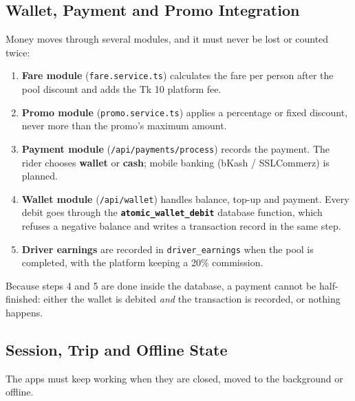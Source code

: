 \subsection{Wallet, Payment and Promo Integration}
\label{subsec:payment-integration}

Money moves through several modules, and it must never be lost or counted
twice:

\begin{enumerate}
  \item \textbf{Fare module} (\texttt{fare.service.ts}) calculates the fare per
        person after the pool discount and adds the Tk 10 platform fee.
  \item \textbf{Promo module} (\texttt{promo.service.ts}) applies a percentage
        or fixed discount, never more than the promo's maximum amount.
  \item \textbf{Payment module} (\texttt{/api/payments/process}) records the
        payment. The rider chooses \textbf{wallet} or \textbf{cash}; mobile
        banking (bKash / SSLCommerz) is planned.
  \item \textbf{Wallet module} (\texttt{/api/wallet}) handles balance, top-up
        and payment. Every debit goes through the
        \textbf{\texttt{atomic\_wallet\_debit}} database function, which
        refuses a negative balance and writes a transaction record in the same
        step.
  \item \textbf{Driver earnings} are recorded in \texttt{driver\_earnings} when
        the pool is completed, with the platform keeping a 20\% commission.
\end{enumerate}

Because steps 4 and 5 are done inside the database, a payment cannot be
half-finished: either the wallet is debited \emph{and} the transaction is
recorded, or nothing happens.

\subsection{Session, Trip and Offline State}
\label{subsec:state}

The apps must keep working when they are closed, moved to the background or
offline.

